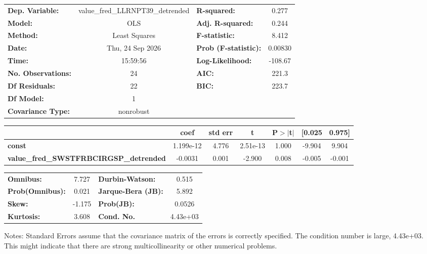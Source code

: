 \begin{center}
\begin{tabular}{lclc}
\toprule
\textbf{Dep. Variable:}                        & value\_fred\_LLRNPT39\_detrended & \textbf{  R-squared:         } &     0.277   \\
\textbf{Model:}                                &               OLS                & \textbf{  Adj. R-squared:    } &     0.244   \\
\textbf{Method:}                               &          Least Squares           & \textbf{  F-statistic:       } &     8.412   \\
\textbf{Date:}                                 &         Thu, 24 Sep 2026         & \textbf{  Prob (F-statistic):} &  0.00830    \\
\textbf{Time:}                                 &             15:59:56             & \textbf{  Log-Likelihood:    } &   -108.67   \\
\textbf{No. Observations:}                     &                  24              & \textbf{  AIC:               } &     221.3   \\
\textbf{Df Residuals:}                         &                  22              & \textbf{  BIC:               } &     223.7   \\
\textbf{Df Model:}                             &                   1              & \textbf{                     } &             \\
\textbf{Covariance Type:}                      &            nonrobust             & \textbf{                     } &             \\
\bottomrule
\end{tabular}
\begin{tabular}{lcccccc}
                                               & \textbf{coef} & \textbf{std err} & \textbf{t} & \textbf{P$> |$t$|$} & \textbf{[0.025} & \textbf{0.975]}  \\
\midrule
\textbf{const}                                 &    1.199e-12  &        4.776     &  2.51e-13  &         1.000        &       -9.904    &        9.904     \\
\textbf{value\_fred\_SWSTFRBCIRGSP\_detrended} &      -0.0031  &        0.001     &    -2.900  &         0.008        &       -0.005    &       -0.001     \\
\bottomrule
\end{tabular}
\begin{tabular}{lclc}
\textbf{Omnibus:}       &  7.727 & \textbf{  Durbin-Watson:     } &    0.515  \\
\textbf{Prob(Omnibus):} &  0.021 & \textbf{  Jarque-Bera (JB):  } &    5.892  \\
\textbf{Skew:}          & -1.175 & \textbf{  Prob(JB):          } &   0.0526  \\
\textbf{Kurtosis:}      &  3.608 & \textbf{  Cond. No.          } & 4.43e+03  \\
\bottomrule
\end{tabular}
\end{center}

Notes: \newline
 [1] Standard Errors assume that the covariance matrix of the errors is correctly specified. \newline
 [2] The condition number is large, 4.43e+03. This might indicate that there are \newline
 strong multicollinearity or other numerical problems.